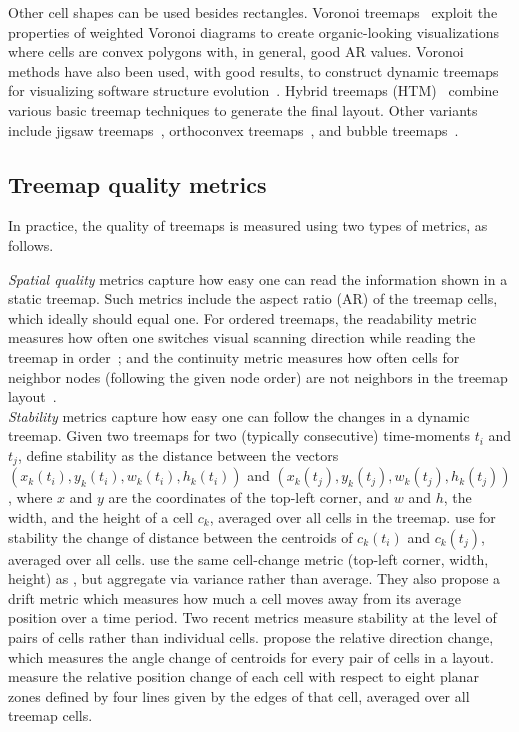 Other cell shapes can be used besides rectangles. Voronoi treemaps~\citep{balzer05,balzer05b} exploit the properties of weighted Voronoi diagrams to create organic-looking visualizations where cells are convex polygons with, in general, good AR values. Voronoi methods have also been used, with good results, to construct dynamic treemaps for visualizing software structure evolution~\citep{hees17,gotz11}. Hybrid treemaps (HTM)~\citep{htm} combine various basic treemap techniques to generate the final layout. Other variants include jigsaw treemaps~\citep{jigsaw}, orthoconvex treemaps~\citep{deberg14}, and bubble treemaps~\citep{bubble}.

\subsection{Treemap quality metrics}
\label{sec:quality}
%
%
In practice, the quality of treemaps is measured using two types of metrics, as follows.

\noindent\emph{Spatial quality} metrics capture how easy one can read the information shown in a static treemap. Such metrics include the aspect ratio (AR) of the treemap cells, which ideally should equal one. For ordered treemaps, the readability metric measures how often one switches visual scanning direction while reading the treemap in order~\citep{bederson02}; and the continuity metric measures how often cells for neighbor nodes (following the given node order) are not neighbors in the treemap layout~\citep{spiral}.\\

\noindent\emph{Stability} metrics capture how easy one can follow the changes in a dynamic treemap. Given two  treemaps for two (typically consecutive) time-moments $t_i$ and $t_j$, \cite{ordered} define stability as the distance between the vectors $(x_k(t_i), y_k(t_i), w_k(t_i), h_k(t_i))$ and $(x_k(t_j), y_k(t_j), w_k(t_j), h_k(t_j))$, where $x$ and $y$ are the coordinates of the top-left corner, and $w$ and $h$, the width, and the height of a cell $c_k$, averaged over all cells in the treemap.
\cite{hahn10} use for stability the change of distance between the centroids of $c_k(t_i)$ and $c_k(t_j)$, averaged over all cells.
\cite{hilbert_moore} use the same cell-change metric (top-left corner, width, height) as \cite{ordered}, but aggregate via variance rather than average. They also propose a drift metric which measures how much a cell moves away from its average position over a time period. Two recent metrics measure stability at the level of pairs of cells rather than individual cells. \cite{Hahn2017} propose the relative direction change, which measures the angle change of centroids for every pair of cells in a layout. \cite{sondag17} measure the relative position change of each cell with respect to eight planar zones defined by four lines given by the edges of that cell, averaged over all treemap cells.

